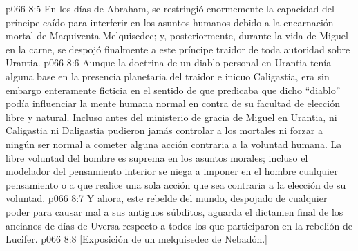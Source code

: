 \vs p066 8:5 En los días de Abraham, se restringió enormemente la capacidad del príncipe caído para interferir en los asuntos humanos debido a la encarnación mortal de Maquiventa Melquisedec; y, posteriormente, durante la vida de Miguel en la carne, se despojó finalmente a este príncipe traidor de toda autoridad sobre Urantia.
\vs p066 8:6 \pc Aunque la doctrina de un diablo personal en Urantia tenía alguna base en la presencia planetaria del traidor e inicuo Caligastia, era sin embargo enteramente ficticia en el sentido de que predicaba que dicho “diablo” podía influenciar la mente humana normal en contra de su facultad de elección libre y natural. Incluso antes del ministerio de gracia de Miguel en Urantia, ni Caligastia ni Daligastia pudieron jamás controlar a los mortales ni forzar a ningún ser normal a cometer alguna acción contraria a la voluntad humana. La libre voluntad del hombre es suprema en los asuntos morales; incluso el modelador del pensamiento interior se niega a imponer en el hombre cualquier pensamiento o a que realice una sola acción que sea contraria a la elección de su voluntad.
\vs p066 8:7 Y ahora, este rebelde del mundo, despojado de cualquier poder para causar mal a sus antiguos súbditos, aguarda el dictamen final de los ancianos de días de Uversa respecto a todos los que participaron en la rebelión de Lucifer.
\vsetoff
\vs p066 8:8 [Exposición de un melquisedec de Nebadón.]
